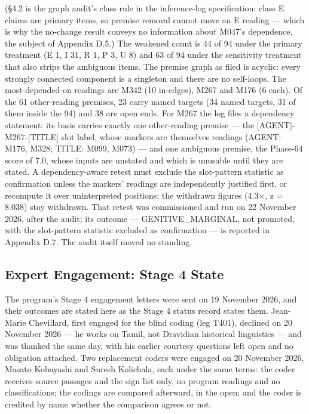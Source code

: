 \documentclass[11pt]{article}
\begin{document}
(§4.2 is the graph audit's class rule in the inference-log
specification: class E claims are primary items, so
premise removal cannot move an E reading --- which is why the
no-change result conveys no information about M047's dependence,
the subject of Appendix D.5.) The weakened count is 44 of 94
under the primary treatment (E 1, I 31, R 1, P 3, U 8) and 63 of
94 under the sensitivity treatment that also strips the
ambiguous items. The premise graph as filed is acyclic: every
strongly connected component is a singleton and there are no
self-loops. The most-depended-on readings are M342 (10
in-edges), M267 and M176 (6 each). Of the 61 other-reading
premises, 23 carry named targets (34 named targets, 31 of them
inside the 94) and 38 are open ends. For M267 the log files a
dependency statement: its basis carries exactly one
other-reading premise --- the [AGENT]-M267-[TITLE] slot label,
whose markers are themselves readings (AGENT: M176, M328; TITLE:
M099, M073) --- and one ambiguous premise, the Phase-64 score of
7.0, whose inputs are unstated and which is unusable until they
are stated. A dependency-aware retest must exclude the
slot-pattern statistic as confirmation unless the markers'
readings are independently justified first, or recompute it over
uninterpreted positions; the withdrawn figures (4.3$\times$,
z = 8.038) stay withdrawn. That retest was commissioned and run
on 22 November 2026, after the audit; its outcome ---
GENITIVE\_MARGINAL, not promoted, with the slot-pattern
statistic excluded as confirmation --- is reported in Appendix
D.7. The audit itself moved no standing.

\subsection{Expert Engagement: Stage 4
State}\label{appendix-d11-stage4}

The program's Stage 4 engagement letters were sent on 19
November 2026, and their outcomes are stated here as the Stage 4
status record states them. Jean-Marie Chevillard, first engaged
for the blind coding (leg T401), declined on 20 November 2026
--- he works on Tamil, not Dravidian historical linguistics ---
and was thanked the same day, with his earlier courtesy
questions left open and no obligation attached. Two replacement
coders were engaged on 20 November 2026, Masato Kobayashi and
Suresh Kolichala, each under the same terms: the coder receives
source passages and the sign list only, no program readings and
no classifications; the codings are compared afterward, in the
open; and the coder is credited by name whether the comparison
agrees or not.
\end{document}
